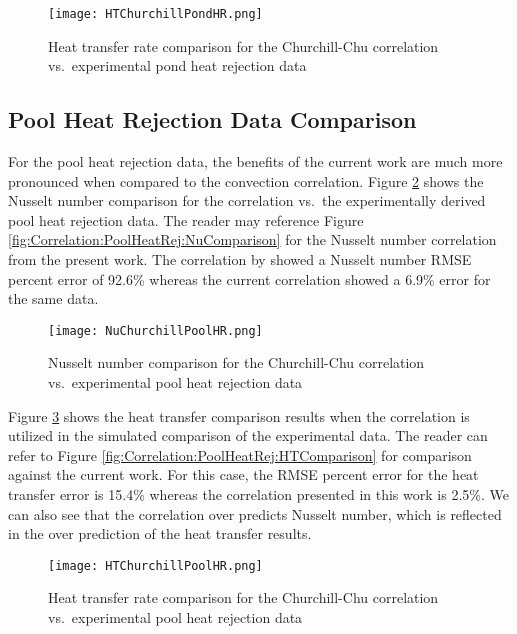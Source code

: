 \begin{figure}
	\centering
	\texttt{[image: HTChurchillPondHR.png]}
	\caption{Heat transfer rate comparison for the Churchill-Chu correlation vs.\ experimental pond heat rejection data}
	\label{fig:Correlation:Churchill:HTPondHR}
\end{figure}

\subsection{Pool Heat Rejection Data Comparison}
\label{Correlation:Churchill:PoolHR}

For the pool heat rejection data, the benefits of the current work are much more pronounced when compared to the \cite{ChurchillChu1975} convection correlation. Figure \ref{fig:Correlation:Churchill:NuPoolHR} shows the Nusselt number comparison for the \cite{ChurchillChu1975} correlation vs.\ the experimentally derived pool heat rejection data. The reader may reference Figure \ref{fig:Correlation:PoolHeatRej:NuComparison} for the Nusselt number correlation from the present work. The correlation by \cite{ChurchillChu1975} showed a Nusselt number RMSE percent error of 92.6\% whereas the current correlation showed a 6.9\% error for the same data.

\begin{figure}
	\centering
	\texttt{[image: NuChurchillPoolHR.png]}
	\caption{Nusselt number comparison for the Churchill-Chu correlation vs.\ experimental pool heat rejection data}
	\label{fig:Correlation:Churchill:NuPoolHR}
\end{figure}

Figure \ref{fig:Correlation:Churchill:HTPoolHR} shows the heat transfer comparison results when the \cite{ChurchillChu1975} correlation is utilized in the simulated comparison of the experimental data. The reader can refer to Figure \ref{fig:Correlation:PoolHeatRej:HTComparison} for comparison against the current work. For this case, the RMSE percent error for the heat transfer error is 15.4\% whereas the correlation presented in this work is 2.5\%. We can also see that the correlation over predicts Nusselt number, which is reflected in the over prediction of the heat transfer results.

\begin{figure}
	\centering
	\texttt{[image: HTChurchillPoolHR.png]}
	\caption{Heat transfer rate comparison for the Churchill-Chu correlation vs.\ experimental pool heat rejection data}
	\label{fig:Correlation:Churchill:HTPoolHR}
\end{figure}

